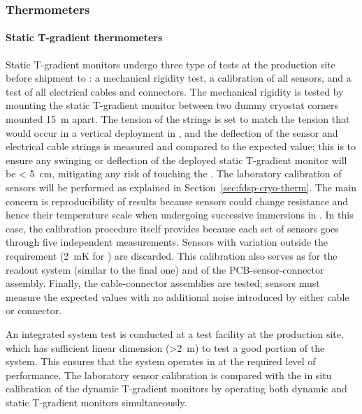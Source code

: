 \subsubsection{Thermometers}
\label{sec:fdgen-slow-cryo-qc-th}

\paragraph{Static T-gradient thermometers}
\label{sec:fdgen-slow-cryo-qc-thst}

Static T-gradient monitors undergo three type of tests at the production site before %
shipment to \surf: a mechanical rigidity test, a calibration of all sensors, and a test of all electrical cables and connectors.
The mechanical rigidity is tested by mounting the static T-gradient monitor between two dummy cryostat corners mounted \SI{15}{m} apart. The tension of the strings is set to match the tension that would occur in a vertical deployment in , and the deflection of the sensor and electrical cable strings is measured and compared to the expected value; this is to ensure any swinging or deflection of the deployed static T-gradient monitor will be < \SI{5}{cm}, mitigating any risk of touching the .
The laboratory calibration of sensors will be performed 
as explained in Section~\ref{sec:fdsp-cryo-therm}. The main concern is reproducibility of results because sensors could change resistance and hence their temperature scale when undergoing successive immersions in . In this case, the calibration procedure itself provides  because each set of sensors goes through five independent measurements. Sensors with \rms variation outside the requirement (\SI{2}{mK} for ) are discarded. This calibration also serves as  for the readout system (similar to the final one) and of the PCB-sensor-connector assembly.
Finally, the cable-connector assemblies are tested; sensors must measure the expected values with no additional noise introduced by either cable or connector. 

An integrated system test is conducted at a  test facility at the production site, which has sufficient linear dimension (>\SI{2}{m}) to test a good portion of the system. This %
ensures that  the system
operates in  at the required level of performance.
The laboratory sensor calibration %
is compared with the in situ calibration
of the dynamic T-gradient monitors by operating both dynamic and static T-gradient monitors simultaneously.   

